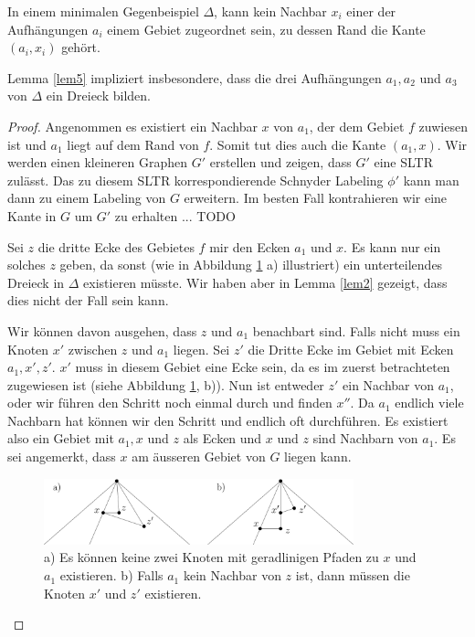 \begin{lemma}\label{lem5}
In einem minimalen Gegenbeispiel $\Delta$, kann kein Nachbar $x_i$ einer der Aufhängungen $a_i$ einem Gebiet zugeordnet sein, zu dessen Rand die Kante $(a_i,x_i)$ gehört.
\end{lemma}

\begin{remark}
Lemma \ref{lem5} impliziert insbesondere, dass die drei Aufhängungen $a_1,a_2$ und $a_3$ von $\Delta$ ein Dreieck bilden.
\end{remark}

\begin{proof}
Angenommen es existiert ein Nachbar $x$ von $a_1$, der dem Gebiet $f$ zuwiesen ist und $a_1$ liegt auf dem Rand von $f$. Somit tut dies auch die Kante $(a_1,x)$. Wir werden einen kleineren Graphen $G'$ erstellen und zeigen, dass $G'$ eine SLTR zulässt. Das zu diesem SLTR korrespondierende Schnyder Labeling $\phi'$ kann man dann zu einem Labeling von $G$ erweitern. Im besten Fall kontrahieren wir eine Kante in $G$ um $G'$ zu erhalten ... TODO

Sei $z$ die dritte Ecke des Gebietes $f$ mir den Ecken $a_1$ und $x$. Es kann nur ein solches $z$ geben, da sonst (wie in Abbildung \ref{pic_lem5_1} a) illustriert) ein unterteilendes Dreieck in $\Delta$ existieren müsste. Wir haben aber in Lemma \ref{lem2} gezeigt, dass dies nicht der Fall sein kann.

Wir können davon ausgehen, dass $z$ und $a_1$ benachbart sind. Falls nicht muss ein Knoten $x'$ zwischen $z$ und $a_1$ liegen. Sei $z'$ die Dritte Ecke im Gebiet mit Ecken $a_1,x',z'$. $x'$ muss in diesem Gebiet eine Ecke sein, da es im zuerst betrachteten zugewiesen ist (siehe Abbildung \ref{pic_lem5_1}, b)). Nun ist entweder $z'$ ein Nachbar von $a_1$, oder wir führen den Schritt noch einmal durch und finden $x''$. Da $a_1$ endlich viele Nachbarn hat können wir den Schritt und endlich oft durchführen. Es existiert also ein Gebiet mit $a_1, x$ und $z$ als Ecken und $x$ und $z$ sind Nachbarn von $a_1$. Es sei angemerkt, dass $x$ am äusseren Gebiet von $G$ liegen kann.

\begin{figure}
	\centering
	  \includegraphics[width=0.8\textwidth]{lem5_1.png}
    	\caption{a) Es können keine zwei Knoten mit geradlinigen Pfaden zu $x$ und $a_1$ existieren. b) Falls $a_1$ kein Nachbar von $z$ ist, dann müssen die Knoten $x'$ und $z'$ existieren.}
    	\label{pic_lem5_1}
\end{figure}


\end{proof}
